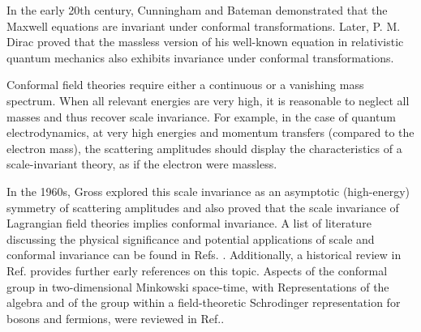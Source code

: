 \documentclass[%
 reprint,
superscriptaddress,
 amsmath,amssymb,
 aps,
]{revtex4-2}
\begin{document}
{\color{blue} In the early 20th century, Cunningham \cite{Cunningham1910} and Bateman \cite{Bateman1910} demonstrated that the Maxwell equations are invariant under conformal transformations. Later, P. M. Dirac \cite{Dirac1936} proved that the massless version of his well-known equation in relativistic quantum mechanics also exhibits invariance under conformal transformations. 

Conformal field theories require either a continuous or a vanishing mass spectrum. When all relevant energies are very high, it is reasonable to neglect all masses and thus recover scale invariance. For example, in the case of quantum electrodynamics, at very high energies and momentum transfers (compared to the electron mass), the scattering amplitudes should display the characteristics of a scale-invariant theory, as if the electron were massless. 

In the 1960s, Gross \cite{Gross1970} explored this scale invariance as an asymptotic (high-energy) symmetry of scattering amplitudes and also proved that the scale invariance of Lagrangian field theories implies conformal invariance. A list of literature discussing the physical significance and potential applications of scale and conformal invariance can be found in Refs. \cite{Wess1960, Gürsey1956, Fulton1962, Kastrup1966, SalamMack1969, Wilson1969, Gross1970}. Additionally, a historical review in Ref. \cite{Kastrup2008} provides further early references on this topic. Aspects of the conformal group in two-dimensional Minkowski space-time, with Representations of the algebra and of the group within a field-theoretic Schrodinger representation for bosons and fermions, were reviewed in Ref.\cite{Jackiw1990}.}
\end{document}
